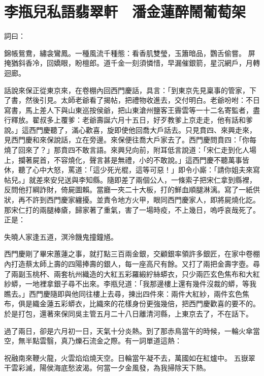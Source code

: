 %

\chapter{李瓶兒私語翡翠軒　潘金蓮醉鬧葡萄架}

詞曰：

錦帳鴛鴦，繡衾鸞鳳。一種風流千種態：看香肌雙瑩，玉簫暗品，鸚舌偷嘗。
屏掩猶斜香冷，回嬌眼，盼檀郎。道千金一刻須憐惜，早漏催銀箭，星沉網戶，月轉迴廊。

話說來保正從東京來，在卷棚內回西門慶話，具言：「到東京先見稟事的管家，下了書，然後引見。太師老爺看了揭帖，把禮物收進去，交付明白。老爺吩咐：不日寫書，馬上差人下與山東巡按侯爺，把山東滄州鹽客王霽雲等一十二名寄監者，盡行釋放。翟叔多上覆爹：老爺壽誕六月十五日，好歹教爹上京走走，他有話和爹說。」這西門慶聽了，滿心歡喜，旋即使他回喬大戶話去。只見賁四、來興走來，見西門慶和來保說話，立在旁邊。來保便往喬大戶家去了。西門慶問賁四：「你每燒了回來了？」那賁四不敢言語。來興兒向前，附耳低言說道：「宋仁走到化人場上，攔著屍首，不容燒化，聲言甚是無禮，小的不敢說。」這西門慶不聽萬事皆休，聽了心中大怒，罵道：「這少死光棍，這等可惡！」即令小廝：「請你姐夫來寫帖兒。」就差來安兒送與李知縣。隨即差了兩個公人，一條索子把宋仁拿到縣裡，反問他打綱詐財，倚屍圖賴。當廳一夾二十大板，打的鮮血順腿淋漓。寫了一紙供狀，再不許到西門慶家纏擾。並責令地方火甲，眼同西門慶家人，即將屍燒化訖。那宋仁打的兩腿棒瘡，歸家著了重氣，害了一場時疫，不上幾日，嗚呼哀哉死了。正是：

失曉人家逢五道，溟泠饑鬼撞鐘馗。

西門慶剛了畢宋蕙蓮之事，就打點三百兩金銀，交顧銀率領許多銀匠，在家中卷棚內打造蔡太師上壽的四陽捧壽的銀人，每一座高尺有餘。又打了兩把金壽字壺。尋了兩副玉桃杯、兩套杭州織造的大紅五彩羅緞紵絲蟒衣，只少兩匹玄色焦布和大紅紗蟒，一地裡拿銀子尋不出來。李瓶兒道：「我那邊樓上還有幾件沒裁的蟒，等我瞧去。」西門慶隨即與他同往樓上去尋，揀出四件來：兩件大紅紗，兩件玄色焦布，俱是織金蓮五彩蟒衣，比織來的花樣身份更強幾倍，把西門慶歡喜的要不的。於是打包，還著來保同吳主管五月二十八日離清河縣，上東京去了，不在話下。

過了兩日，卻是六月初一日，天氣十分炎熱。到了那赤鳥當午的時候，一輪火傘當空，無半點雲翳，真乃爍石流金之際。有一詞單道這熱：

祝融南來鞭火龍，火雲焰焰燒天空。日輪當午凝不去，萬國如在紅爐中。
五嶽翠干雲彩滅，陽侯海底愁波渴。何當一夕金風發，為我掃除天下熱。

